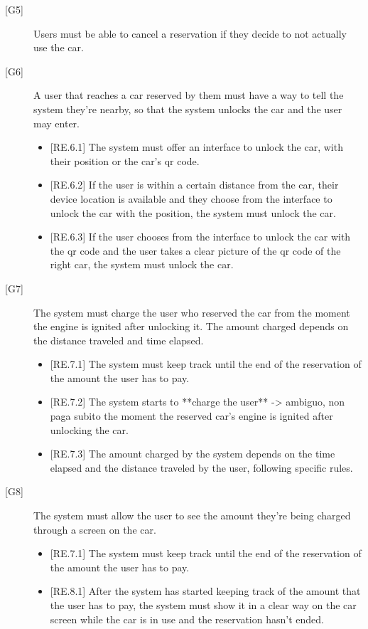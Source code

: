 \documentclass[english]{article}
\begin{document}
\begin{description}
\item[{[G5]}]{Users must be able to cancel a reservation if they decide to not actually use the car.}

\item[{[G6]}]{A user that reaches a car reserved by them must have a way to tell the system they’re nearby, so that the system unlocks the car and the user may enter.
\begin{itemize}
	\item{[RE.6.1] The system must offer an interface to unlock the car, with their position or the car's qr code.}
	\item{[RE.6.2] If the user is within a certain distance from the car, their device location is available and they choose from the interface to unlock the car with the position, the system must unlock the car.}
	\item{[RE.6.3] If the user chooses from the interface to unlock the car with the qr code and the user takes a clear picture of the qr code of the right car, the system must unlock the car.}
\end{itemize}
}

\item[{[G7]}]{The system must charge the user who reserved the car from the moment the engine is ignited after unlocking it. The amount charged depends on the distance traveled and time elapsed.
\begin{itemize}
	\item{[RE.7.1] The system must keep track until the end of the reservation of the amount the user has to pay.}
	\item{[RE.7.2] The system starts to **charge the user** -> ambiguo, non paga subito  the moment the reserved car’s engine is ignited after unlocking the car.}
	\item{[RE.7.3] The amount charged by the system depends on the time elapsed and the distance traveled by the user, following specific rules.}
\end{itemize}
}

\item[{[G8]}]{The system must allow the user to see the amount they’re being charged through a screen on the car.
\begin{itemize}
	\item{[RE.7.1] The system must keep track until the end of the reservation of the amount the user has to pay.}
	\item{[RE.8.1] After the system has started keeping track of the amount that the user has to pay, the system must show it in a clear way on the car screen while the car is in use and the reservation hasn’t ended.}
\end{itemize}
}


\end{description}
\end{document}
